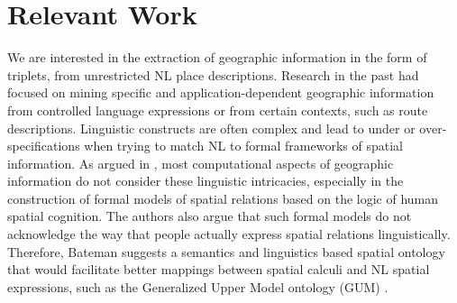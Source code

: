 \documentclass{acm_proc_article-sp}
\begin{document}
\section{Relevant Work}
We are interested in the extraction of geographic information in the form of triplets, from unrestricted NL place descriptions. Research in the past had focused on mining specific and application-dependent geographic information from controlled language expressions \cite{kelleher:perceptually, Hanjing:route, tappan:knowledge} or from certain contexts, such as route descriptions. Linguistic constructs are often complex and lead to under or over-specifications when trying to match NL to formal frameworks of spatial information. As argued in \cite{Bateman:ontology}, most computational aspects of geographic information do not consider these linguistic intricacies, especially in the construction of formal models of spatial relations based on the logic of human spatial cognition. The authors also argue that such formal models do not acknowledge the way that people actually express spatial relations linguistically. Therefore, Bateman \cite{Bateman:language} suggests a semantics and linguistics based spatial ontology that would facilitate better mappings between spatial calculi and NL spatial expressions, such as the Generalized Upper Model ontology (GUM) \cite{Bateman:data}.
\end{document}
